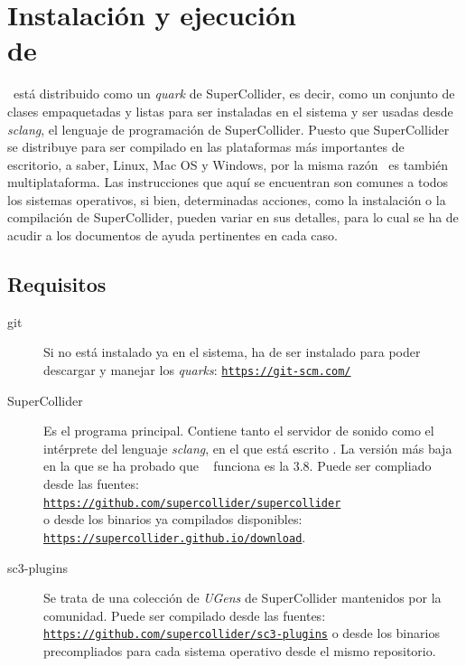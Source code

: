  \chapter[Instalación y ejecución de \appName]{Instalación y ejecución\\ de \appName}

\appName~está distribuido como un \textit{quark} de SuperCollider, es decir, como un conjunto de clases empaquetadas y listas para ser instaladas en el sistema y ser usadas desde \textit{sclang}, el lenguaje de programación de SuperCollider.  Puesto que SuperCollider se distribuye para ser compilado en las plataformas más importantes de escritorio, a saber, Linux, Mac OS y Windows, por la misma razón \appName~es también multiplataforma. Las instrucciones que aquí se encuentran son comunes a todos los sistemas operativos, si bien, determinadas acciones, como la instalación o la compilación de SuperCollider, pueden variar en sus detalles, para lo cual se ha de acudir a los documentos de ayuda pertinentes en cada caso.

\section{Requisitos}
\begin{description}
	\item[git] Si no está instalado ya en el sistema, ha de ser instalado para poder descargar y manejar los \textit{quarks}: \href{https://git-scm.com/}{\texttt{https://git-scm.com/}}
	
	\item[SuperCollider] Es el programa principal. Contiene tanto el servidor de sonido como el intérprete del lenguaje \textit{sclang}, en el que está escrito \appName. La versión más baja en la que se ha probado que \appName~ funciona es la 3.8. Puede ser compliado desde las fuentes:\\ \href{https://github.com/supercollider/supercollider}{\texttt{https://github.com/supercollider/supercollider}}\\ o desde los binarios ya compilados disponibles:\\ \href{https://supercollider.github.io/download}{\texttt{https://supercollider.github.io/download}}.
	
	\item[sc3-plugins]  Se trata de una colección de \textit{UGens} de SuperCollider mantenidos por la comunidad. Puede ser compilado desde las fuentes:\\ \href{https://github.com/supercollider/sc3-plugins}{\texttt{https://github.com/supercollider/sc3-plugins}} o desde los binarios precompliados para cada sistema operativo desde el mismo repositorio.
\end{description}


